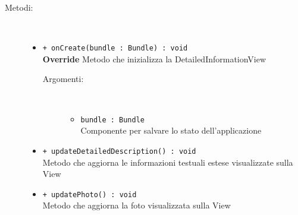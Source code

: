 \documentclass[../DefinizioneDiProdotto.tex]{subfiles}
\begin{document}
\begin{description}
\begin{itemize}
	\end{itemize}
	\item[Metodi:] \
	\begin{itemize}
		\item \texttt{+ onCreate(bundle : Bundle) : void}\\
		\textbf{Override} Metodo che inizializza la DetailedInformationView
		\begin{description}
			\item[Argomenti:] \
			\begin{itemize}
				\item \texttt{bundle : Bundle}\\
				Componente per salvare lo stato dell'applicazione\end{itemize}
		\end{description}
		\item \texttt{+ updateDetailedDescription() : void}\\
		Metodo che aggiorna le informazioni testuali estese visualizzate sulla View
		\item \texttt{+ updatePhoto() : void}\\
		Metodo che aggiorna la foto visualizzata sulla View
	\end{itemize}
\end{description}
\end{document}
